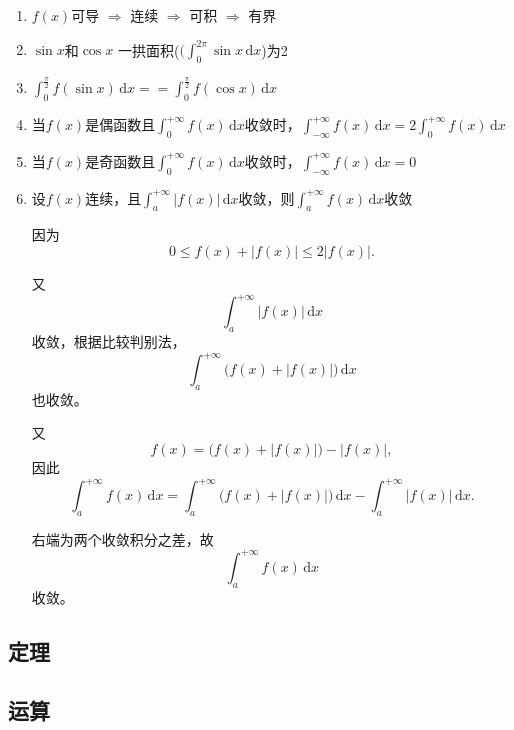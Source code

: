 \documentclass[a4paper,12pt]{article}
\begin{document}
    \begin{enumerate}
        \item $f(x)$可导 $\Rightarrow$ 连续 $\Rightarrow$ 可积 $\Rightarrow$ 有界
        \item $\sin x$和$\cos x$ 一拱面积($(\int_0^{2\pi} \sin x\,\mathrm{d}x$)为2
        \item $\int_0^{\frac{\pi}{2}} f(\sin x)\,\mathrm{d}x == \int_0^{\frac{\pi}{2}} f(\cos x)\,\mathrm{d}x$
        \item 当$f(x)$是偶函数且$\int_0^{+\infty} f(x)\,\mathrm{d}x$收敛时，$\int_{-\infty}^{+\infty} f(x)\,\mathrm{d}x = 2\int_0^{+\infty} f(x)\,\mathrm{d}x$
        \item 当$f(x)$是奇函数且$\int_0^{+\infty} f(x)\,\mathrm{d}x$收敛时，$\int_{-\infty}^{+\infty} f(x)\,\mathrm{d}x = 0$
        \item 设$f(x)$连续，且$\int_a^{+\infty} |f(x)|\,\mathrm{d}x$收敛，则$\int_a^{+\infty} f(x)\,\mathrm{d}x$收敛
        \begin{analysisbox}[证:]
            因为
            \[
                0 \le f(x)+|f(x)| \le 2|f(x)|.
            \]

            又
            \[
                \int_a^{+\infty} |f(x)|\,\mathrm{d}x
            \]
            收敛，根据比较判别法，
            \[
                \int_a^{+\infty} \bigl(f(x)+|f(x)|\bigr)\,\mathrm{d}x
            \]
            也收敛。

            又
            \[
                f(x)=\bigl(f(x)+|f(x)|\bigr)-|f(x)|,
            \]
            因此
            \[
                \int_a^{+\infty} f(x)\,\mathrm{d}x
                =
                \int_a^{+\infty} \bigl(f(x)+|f(x)|\bigr)\,\mathrm{d}x
                -
                \int_a^{+\infty} |f(x)|\,\mathrm{d}x.
            \]

            右端为两个收敛积分之差，故
            \[
                \int_a^{+\infty} f(x)\,\mathrm{d}x
            \]
            收敛。
        \end{analysisbox}
    \end{enumerate}

    \subsection{定理}

    \begin{enumerate}
    \end{enumerate}

    \subsection{运算}
\end{document}
